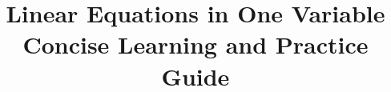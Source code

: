 \makeatletter
{}
\makeatother


\geometry{left=0.48in,right=0.48in,top=0.42in,bottom=0.48in}
\linespread{1.03}
\setlength{\parskip}{2pt}

\setlength{\columnseprule}{0.4pt} %
\setlength{\columnsep}{15pt}      %

\usepackage{varwidth}
\newcommand{\heading}[1]{%
    \par\needspace{4\baselineskip}\addvspace{4pt}%
    {\centering\large\bfseries
     \tikz[baseline=(title.base)]{%
         \node[fill=black!10,draw=black,line width=0.2pt,text=black,
             rounded corners=2mm,inner sep=3pt,outer sep=0pt] (title) {%
             \begin{varwidth}{\dimexpr\linewidth-6.2pt\relax}%
                 \centering\strut #1\strut
             \end{varwidth}};}\par}%
    \nopagebreak[4]\smallskip
}
\newcommand{\taskheading}[2]{%
    \par\needspace{5\baselineskip}\addvspace{4pt}%
    \noindent\tikz[baseline=(title.base)]{%
        \node[fill=black!5,text=black,rounded corners=2mm,
            inner sep=3pt,outer sep=0pt] (title) {%
            \begin{varwidth}{\dimexpr\linewidth-6pt\relax}%
                \raggedright\bfseries\strut #1\strut
            \end{varwidth}};}#2\par\nopagebreak[4]\smallskip
}

\title{\vspace{-13mm}\textbf{Linear Equations in One Variable}\\[-1mm]
	\large Concise Learning and Practice Guide}
\author{}
\date{}
\pagestyle{empty}


	\maketitle
	\vspace{-22mm}
	
